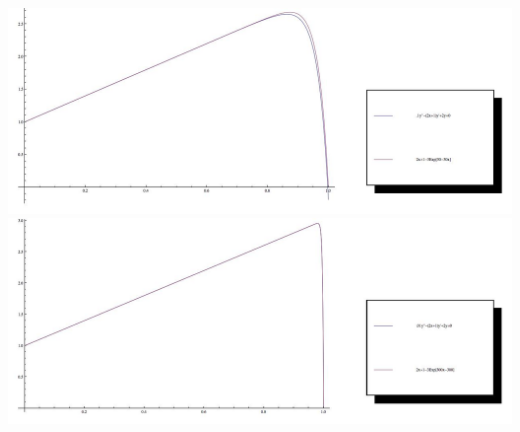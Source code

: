 \documentclass[12pt]{article}
\begin{document}
\newpage
\begin{table}[c]
	\includegraphics[width=6in]{graph3.jpg}\\
	\includegraphics[width=6in]{graph4.jpg}
\end{table}
\end{document}
